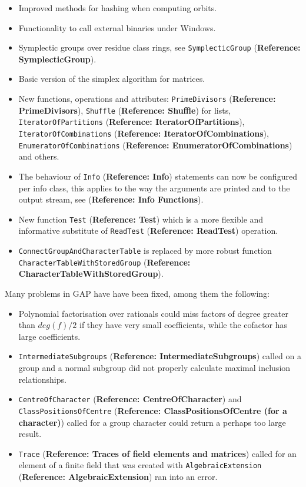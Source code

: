 \documentclass[a4paper,11pt]{report}
\begin{document}
{{{\begin{itemize}
and Unix. 
\item  Improved methods for hashing when computing orbits. 
\item  Functionality to call external binaries under Windows. 
\item  Symplectic groups over residue class rings, see \texttt{SymplecticGroup} (\textbf{Reference: SymplecticGroup}). 
\item  Basic version of the simplex algorithm for matrices. 
\item  New functions, operations and attributes: \texttt{PrimeDivisors} (\textbf{Reference: PrimeDivisors}), \texttt{Shuffle} (\textbf{Reference: Shuffle}) for lists, \texttt{IteratorOfPartitions} (\textbf{Reference: IteratorOfPartitions}), \texttt{IteratorOfCombinations} (\textbf{Reference: IteratorOfCombinations}), \texttt{EnumeratorOfCombinations} (\textbf{Reference: EnumeratorOfCombinations}) and others. 
\item  The behaviour of \texttt{Info} (\textbf{Reference: Info}) statements can now be configured per info class, this applies to the way the
arguments are printed and to the output stream, see  (\textbf{Reference: Info Functions}). 
\item  New function \texttt{Test} (\textbf{Reference: Test}) which is a more flexible and informative substitute of \texttt{ReadTest} (\textbf{Reference: ReadTest}) operation. 
\item  \texttt{ConnectGroupAndCharacterTable} is replaced by more robust function \texttt{CharacterTableWithStoredGroup} (\textbf{Reference: CharacterTableWithStoredGroup}). 
\end{itemize}
 Many problems in \textsf{GAP} have have been fixed, among them the following: 
\begin{itemize}
\item  Polynomial factorisation over rationals could miss factors of degree greater
than $deg(f)/2$ if they have very small coefficients, while the cofactor has large
coefficients. 
\item  \texttt{IntermediateSubgroups} (\textbf{Reference: IntermediateSubgroups}) called on a group and a normal subgroup did not properly calculate maximal
inclusion relationships. 
\item  \texttt{CentreOfCharacter} (\textbf{Reference: CentreOfCharacter}) and \texttt{ClassPositionsOfCentre} (\textbf{Reference: ClassPositionsOfCentre (for a character)}) called for a group character could return a perhaps too large result. 
\item  \texttt{Trace} (\textbf{Reference: Traces of field elements and matrices}) called for an element of a finite field that was created with \texttt{AlgebraicExtension} (\textbf{Reference: AlgebraicExtension}) ran into an error. 

\end{itemize}}}}
\end{document}
